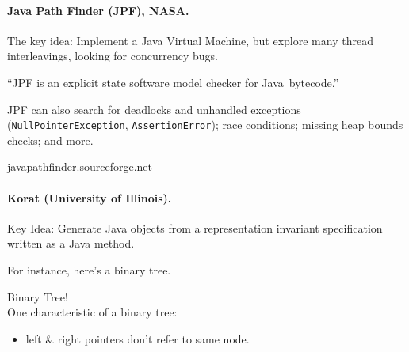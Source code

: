\documentclass[11pt]{article}
\begin{document}
\paragraph{Java Path Finder (JPF), NASA.}
The key idea:
Implement a Java Virtual Machine,
    but explore many thread interleavings,
    looking for concurrency bugs.

\begin{center}    
  ``JPF is an explicit state software model checker for Java\texttrademark ~bytecode.''
\end{center}

JPF can also search for deadlocks and unhandled exceptions ({\tt NullPointerException}, {\tt AssertionError}); race conditions; missing heap bounds checks; and more.

\begin{center}
  \url{javapathfinder.sourceforge.net}
\end{center}

\paragraph{Korat (University of Illinois).}
Key Idea: Generate Java objects from a representation invariant specification
written as a Java method.

For instance, here's a binary tree.
 \hspace*{2em} Binary Tree!\\[1em]

One characteristic of a binary tree:
\begin{itemize}
\item left \& right pointers don't refer to same node.
\end{itemize}
\end{document}
